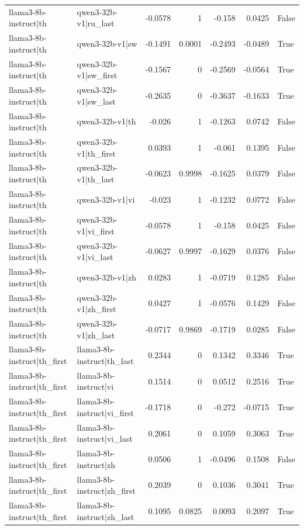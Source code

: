 \begin{table}
\begin{tabular}{l l r r r r l}
llama3-8b-instruct|th & qwen3-32b-v1|ru_last & -0.0578 & 1 & -0.158 & 0.0425 & False \\
llama3-8b-instruct|th & qwen3-32b-v1|sw & -0.1491 & 0.0001 & -0.2493 & -0.0489 & True \\
llama3-8b-instruct|th & qwen3-32b-v1|sw_first & -0.1567 & 0 & -0.2569 & -0.0564 & True \\
llama3-8b-instruct|th & qwen3-32b-v1|sw_last & -0.2635 & 0 & -0.3637 & -0.1633 & True \\
llama3-8b-instruct|th & qwen3-32b-v1|th & -0.026 & 1 & -0.1263 & 0.0742 & False \\
llama3-8b-instruct|th & qwen3-32b-v1|th_first & 0.0393 & 1 & -0.061 & 0.1395 & False \\
llama3-8b-instruct|th & qwen3-32b-v1|th_last & -0.0623 & 0.9998 & -0.1625 & 0.0379 & False \\
llama3-8b-instruct|th & qwen3-32b-v1|vi & -0.023 & 1 & -0.1232 & 0.0772 & False \\
llama3-8b-instruct|th & qwen3-32b-v1|vi_first & -0.0578 & 1 & -0.158 & 0.0425 & False \\
llama3-8b-instruct|th & qwen3-32b-v1|vi_last & -0.0627 & 0.9997 & -0.1629 & 0.0376 & False \\
llama3-8b-instruct|th & qwen3-32b-v1|zh & 0.0283 & 1 & -0.0719 & 0.1285 & False \\
llama3-8b-instruct|th & qwen3-32b-v1|zh_first & 0.0427 & 1 & -0.0576 & 0.1429 & False \\
llama3-8b-instruct|th & qwen3-32b-v1|zh_last & -0.0717 & 0.9869 & -0.1719 & 0.0285 & False \\
llama3-8b-instruct|th_first & llama3-8b-instruct|th_last & 0.2344 & 0 & 0.1342 & 0.3346 & True \\
llama3-8b-instruct|th_first & llama3-8b-instruct|vi & 0.1514 & 0 & 0.0512 & 0.2516 & True \\
llama3-8b-instruct|th_first & llama3-8b-instruct|vi_first & -0.1718 & 0 & -0.272 & -0.0715 & True \\
llama3-8b-instruct|th_first & llama3-8b-instruct|vi_last & 0.2061 & 0 & 0.1059 & 0.3063 & True \\
llama3-8b-instruct|th_first & llama3-8b-instruct|zh & 0.0506 & 1 & -0.0496 & 0.1508 & False \\
llama3-8b-instruct|th_first & llama3-8b-instruct|zh_first & 0.2039 & 0 & 0.1036 & 0.3041 & True \\
llama3-8b-instruct|th_first & llama3-8b-instruct|zh_last & 0.1095 & 0.0825 & 0.0093 & 0.2097 & True \\

\end{tabular}
\end{table}
